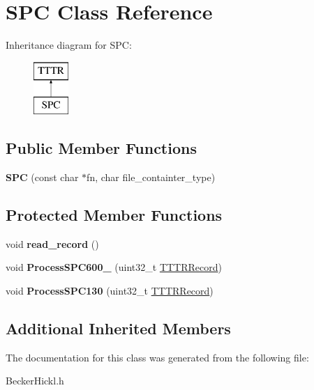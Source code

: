 \hypertarget{class_s_p_c}{}\section{S\+PC Class Reference}
\label{class_s_p_c}
Inheritance diagram for S\+PC\+:\begin{figure}[H]
\begin{center}
\leavevmode
\includegraphics[height=2.000000cm]{class_s_p_c}
\end{center}
\end{figure}
\subsection*{Public Member Functions}
\begin{DoxyCompactItemize}
\item 
\mbox{\label{class_s_p_c_afa1d1abcb27521255684319bbbab7f77}} 
{\bfseries S\+PC} (const char $\ast$fn, char file\+\_\+containter\+\_\+type)
\end{DoxyCompactItemize}
\subsection*{Protected Member Functions}
\begin{DoxyCompactItemize}
\item 
\mbox{\label{class_s_p_c_a7afb568ee39f42b34c97dd8d54bc101e}} 
void {\bfseries read\+\_\+record} ()
\item 
\mbox{\label{class_s_p_c_acf6bfd06af6d81e61971a74e4ac78aa9}} 
void {\bfseries Process\+S\+P\+C600\+\_} (uint32\+\_\+t \hyperlink{class_t_t_t_r_aeca22c4f524dbb501b7545d397e8f782}{T\+T\+T\+R\+Record})
\item 
\mbox{\label{class_s_p_c_a35613fb6866d61b2e50656351531afee}} 
void {\bfseries Process\+S\+P\+C130} (uint32\+\_\+t \hyperlink{class_t_t_t_r_aeca22c4f524dbb501b7545d397e8f782}{T\+T\+T\+R\+Record})
\end{DoxyCompactItemize}
\subsection*{Additional Inherited Members}


The documentation for this class was generated from the following file\+:\begin{DoxyCompactItemize}
\item 
Becker\+Hickl.\+h\end{DoxyCompactItemize}
